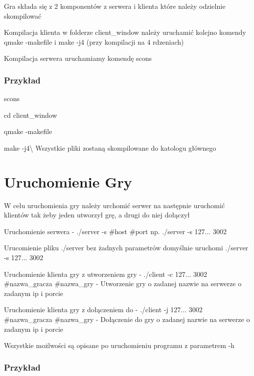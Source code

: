 Gra składa się z 2 komponentów z serwera i klienta które należy odzielnie skompilować
\begin{DoxyItemize}
\item Kompilacja klienta w folderze client\+\_\+window należy uruchamić kolejno komendy qmake -\/makefile i make -\/j4 (przy kompilacji na 4 rdzeniach)
\item Kompilacja serwera uruchamiamy komendę scons \subsubsection*{Przykład}
\end{DoxyItemize}


\begin{DoxyItemize}
\item scons
\item cd client\+\_\+window
\item qmake -\/makefile
\item make -\/j4\textbackslash{} Wszystkie pliki zostaną skompilowane do katologu głównego
\end{DoxyItemize}

\section*{Uruchomienie Gry}

W celu uruchomienia gry należy urchomić serwer na następnie uruchomić klientów tak żeby jeden utworzył grę, a drugi do niej dołączył
\begin{DoxyItemize}
\item Uruchomienie serwera -\/ ./server -\/s \#host \#port np. ./server -\/s 127... 3002
\item Urucomienie pliku ./server bez żadnych parametrów domyślnie uruchomi ./server -\/s 127... 3002
\item Uruchomienie klienta gry z utworzeniem gry -\/ ./client -\/c 127... 3002 \#nazwa\+\_\+gracza \#nazwa\+\_\+gry -\/ Utworzenie gry o zadanej nazwie na serwerze o zadanym ip i porcie
\item Uruchomienie klienta gry z dołączeniem do -\/ ./client -\/j 127... 3002 \#nazwa\+\_\+gracza \#nazwa\+\_\+gry -\/ Dołączenie do gry o zadanej nazwie na serwerze o zadanym ip i porcie
\item Wszystkie możlwości są opisane po uruchomieniu programu z parametrem -\/h \subsubsection*{Przykład}
\end{DoxyItemize}


